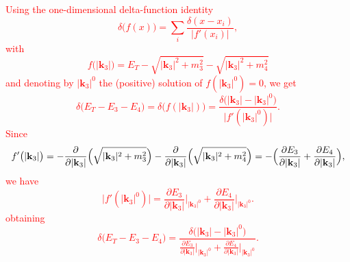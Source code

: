 \documentclass[11pt, notitlepage]{report}
\numberwithin{equation}{section}
\begin{document}
    \textcolor{red}{Using the one-dimensional delta-function identity
\[
\delta\bigl(f(x)\bigr)
=\sum_{i}\frac{\delta(x-x_i)}{\bigl|f'(x_i)\bigr|},
\]
with
\[
f\bigl(|\mathbf{k}_3|\bigr)
=E_T - \sqrt{|\mathbf{k}_3|^2 + m_3^2}
         - \sqrt{|\mathbf{k}_3|^2 + m_4^2}
\]
and denoting by $|\mathbf{k}_3|^0$ the (positive) solution of $f(|\mathbf{k}_3|^0)=0$, we get
\[
\delta\bigl(E_T - E_3 - E_4\bigr)
=\delta\bigl(f(|\mathbf{k}_3|)\bigr)
=\frac{\delta\bigl(|\mathbf{k}_3| - |\mathbf{k}_3|^0\bigr)}
      {\bigl|f'(|\mathbf{k}_3|^0)\bigr|}.
\]
Since
\[
f'\bigl(|\mathbf{k}_3|\bigr)
=-\frac{\partial}{\partial|\mathbf{k}_3|}
 \Bigl(\sqrt{|\mathbf{k}_3|^2 + m_3^2}\Bigr)
-\frac{\partial}{\partial|\mathbf{k}_3|}
 \Bigl(\sqrt{|\mathbf{k}_3|^2 + m_4^2}\Bigr)
=-\Bigl(\frac{\partial E_3}{\partial|\mathbf{k}_3|}
     +\frac{\partial E_4}{\partial|\mathbf{k}_3|}\Bigr),
\]
we have
\[
\bigl|f'(|\mathbf{k}_3|^0)\bigr|
=\frac{\partial E_3}{\partial|\mathbf{k}_3|}\Big|_{|\mathbf{k}_3|^0}
+\frac{\partial E_4}{\partial|\mathbf{k}_3|}\Big|_{|\mathbf{k}_3|^0}.
\]
obtaining
\[
\delta\bigl(E_T - E_3 - E_4\bigr)
=\frac{
  \delta\bigl(|\mathbf{k}_3| - |\mathbf{k}_3|^0\bigr)
}{
  \displaystyle
  \frac{\partial E_3}{\partial|\mathbf{k}_3|}\Big|_{|\mathbf{k}_3|^0}
  +\frac{\partial E_4}{\partial|\mathbf{k}_3|}\Big|_{|\mathbf{k}_3|^0}
}.
\]}
\end{document}
